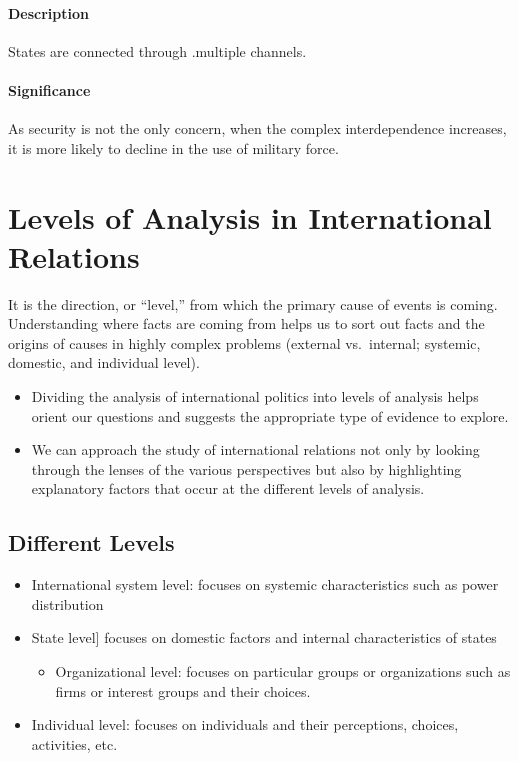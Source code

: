\documentclass[
]{book}
\providecommand{\tightlist}{%
  \setlength{\itemsep}{0pt}\setlength{\parskip}{0pt}}
\begin{document}
\hypertarget{description-8}{%
\subsubsection{Description}\label{description-8}}

States are connected through .multiple channels.

\hypertarget{significance-9}{%
\subsubsection{Significance}\label{significance-9}}

As security is not the only concern, when the complex interdependence increases, it is more likely to decline in the use of military force.

\hypertarget{levels-of-analysis-in-international-relations}{%
\chapter{Levels of Analysis in International Relations}\label{levels-of-analysis-in-international-relations}}

It is the direction, or ``level,'' from which the primary cause of events is coming. Understanding where facts are coming from helps us to sort out facts and the origins of causes in highly complex problems (external vs.~internal; systemic, domestic, and individual level).

\begin{itemize}
\item
  Dividing the analysis of international politics into levels of analysis helps orient our questions and suggests the appropriate type of evidence to explore.
\item
  We can approach the study of international relations not only by looking through the lenses of the various perspectives but also by highlighting explanatory factors that occur at the different levels of analysis.
\end{itemize}

\hypertarget{different-levels}{%
\section{Different Levels}\label{different-levels}}

\begin{itemize}
\item
  International system level: focuses on systemic characteristics such as power distribution
\item
  State level{]} focuses on domestic factors and internal characteristics of states

  \begin{itemize}
  \tightlist
  \item
    Organizational level: focuses on particular groups or organizations such as firms or interest groups and their choices.
  \end{itemize}
\item
  Individual level: focuses on individuals and their perceptions, choices, activities, etc.
\end{itemize}
\end{document}
